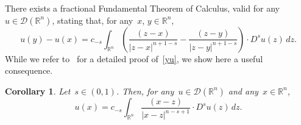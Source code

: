 \documentclass[11pt,hyp,]{nyjm}
\numberwithin{equation}{section}
\newcommand{\R}{\mathbb{R}}
\newtheorem{corollary}[theorem]{Corollary}
\theoremstyle{remark}
\newcommand{\Int}{\int_{\mathbb{R}^n}}
\begin{document}
There exists a fractional Fundamental Theorem of Calculus, valid for any~$u \in \mathcal{D}(\R^n)$, stating that, for any~$x$, $y \in \R^n$,
			\begin{equation}\label{yu}
				u(y)-u(x) = c_{-s} \Int \left( \frac{(z-x)}{|z-x|^{n+1-s}} - \frac{(z-y)}{|z-y|^{n+1-s}} \right) \cdot D^{s}u(z) \, dz.
			\end{equation} 
			While we refer to~\cite[Theorem~3.12]{comi} for a detailed proof of~\eqref{yu}, we show here a useful consequence.
			
			\begin{corollary}\label{aar}
				Let~$s \in (0,1)$. Then, for any~$u \in \mathcal{D}(\R^n)$ and any~$x \in \R^n$,
				\[ u(x)= c_{-s} \Int \frac{(x-z)}{|x-z|^{n-s+1}}\cdot D^s u (z) \, dz. \]
			\end{corollary}
			
\end{document}
